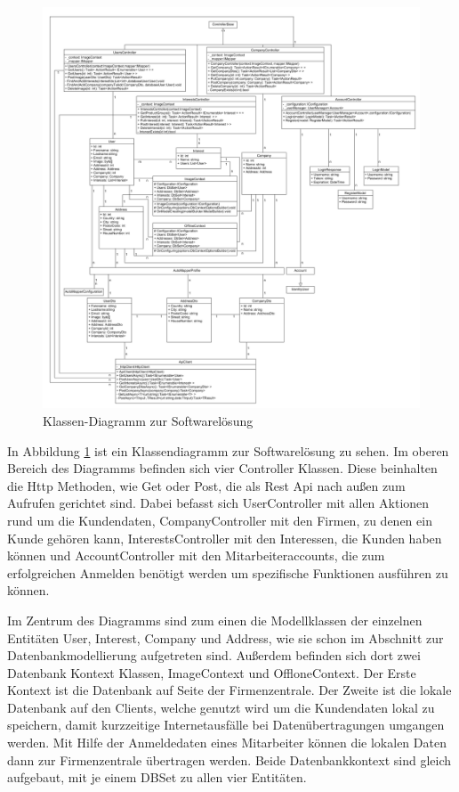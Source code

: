 \begin{figure}[h]
	\centering
	\includegraphics[width=1.1\linewidth]{Images/Projekt_Messe_Class2}
	\caption{Klassen-Diagramm zur Softwarelösung}
	\label{fig:projektmesseclass}
\end{figure}

In Abbildung \ref{fig:projektmesseclass} ist ein Klassendiagramm zur Softwarelösung zu sehen. Im oberen Bereich des Diagramms befinden sich vier Controller Klassen. Diese beinhalten die Http Methoden, wie Get oder Post, die als Rest Api nach außen zum Aufrufen gerichtet sind. Dabei befasst sich UserController mit allen Aktionen rund um die Kundendaten, CompanyController mit den Firmen, zu denen ein Kunde gehören kann, InterestsController mit den Interessen, die Kunden haben können und AccountController mit den Mitarbeiteraccounts, die zum erfolgreichen Anmelden benötigt werden um spezifische Funktionen ausführen zu können.

Im Zentrum des Diagramms sind zum einen die Modellklassen der einzelnen Entitäten User, Interest, Company und Address, wie sie schon im Abschnitt zur Datenbankmodellierung aufgetreten sind. Außerdem befinden sich dort zwei Datenbank Kontext Klassen, ImageContext und OffloneContext. Der Erste Kontext ist die Datenbank auf Seite der Firmenzentrale. Der Zweite ist die lokale Datenbank auf den Clients, welche genutzt wird um die Kundendaten lokal zu speichern, damit kurzzeitige Internetausfälle bei Datenübertragungen umgangen werden. Mit Hilfe der Anmeldedaten eines Mitarbeiter können die lokalen Daten dann zur Firmenzentrale übertragen werden. Beide Datenbankkontext sind gleich aufgebaut, mit je einem DBSet zu allen vier Entitäten.

